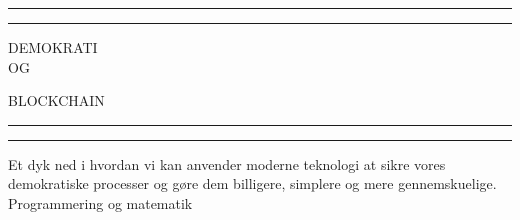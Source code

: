 \documentclass[a4paper, 8pt, oneside]{article} %
\begin{document}
\begin{titlepage} %

	\centering %

	\scshape %

	\vspace*{\baselineskip} %


	\rule{\textwidth}{1.6pt}\vspace*{-\baselineskip}\vspace*{2pt} %
	\rule{\textwidth}{0.4pt} %

	\vspace{0.75\baselineskip} %

	{\LARGE DEMOKRATI\\ OG\\ } %

	\vspace{0.75\baselineskip} %

	{\LARGE BLOCKCHAIN}

	\vspace{0.75\baselineskip} %

	\rule{\textwidth}{0.4pt}\vspace*{-\baselineskip}\vspace{3.2pt} %
	\rule{\textwidth}{1.6pt} %

	\vspace{2\baselineskip} %

	
	Et dyk ned i hvordan vi kan anvender moderne teknologi at sikre vores demokratiske processer og gøre dem billigere, simplere og mere gennemskuelige.\\ 
	Programmering og matematik%
	
	\vspace*{3\baselineskip} %
	
	

\end{titlepage}
\end{document}
